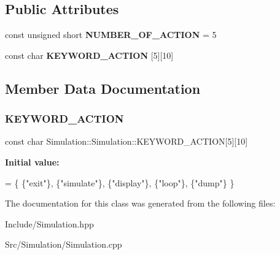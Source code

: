 \subsection*{Public Attributes}
\begin{DoxyCompactItemize}
\item 
\mbox{\label{classSimulation_1_1Simulation_a878d9eb9115a47f4f4a7cbda563206d3}} 
const unsigned short {\bfseries N\+U\+M\+B\+E\+R\+\_\+\+O\+F\+\_\+\+A\+C\+T\+I\+ON} = 5
\item 
const char {\bfseries K\+E\+Y\+W\+O\+R\+D\+\_\+\+A\+C\+T\+I\+ON} \mbox{[}5\mbox{]}\mbox{[}10\mbox{]}
\end{DoxyCompactItemize}


\subsection{Member Data Documentation}
\mbox{\label{classSimulation_1_1Simulation_a57291730d3870825cc74e9fbd43b179f}} 
\subsubsection{\texorpdfstring{K\+E\+Y\+W\+O\+R\+D\+\_\+\+A\+C\+T\+I\+ON}{KEYWORD\_ACTION}}
{\footnotesize\ttfamily const char Simulation\+::\+Simulation\+::\+K\+E\+Y\+W\+O\+R\+D\+\_\+\+A\+C\+T\+I\+ON\mbox{[}5\mbox{]}\mbox{[}10\mbox{]}}

{\bfseries Initial value\+:}
\begin{DoxyCode}
= \{
            \{\textcolor{stringliteral}{"exit"}\}, \{\textcolor{stringliteral}{"simulate"}\}, \{\textcolor{stringliteral}{"display"}\},
            \{\textcolor{stringliteral}{"loop"}\}, \{\textcolor{stringliteral}{"dump"}\}
        \}
\end{DoxyCode}


The documentation for this class was generated from the following files\+:\begin{DoxyCompactItemize}
\item 
Include/Simulation.\+hpp\item 
Src/\+Simulation/Simulation.\+cpp\end{DoxyCompactItemize}
